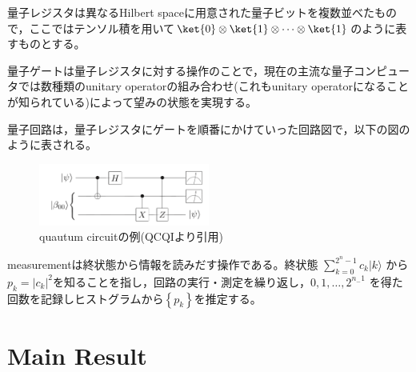 \documentclass[b5paper,papersize,dvipdfmx,fleqn]{jsarticle}
\begin{document}
量子レジスタは異なるHilbert spaceに用意された量子ビットを複数並べたもので，ここではテンソル積を用いて$\ket{0}\otimes \ket{1}\otimes \cdots \otimes \ket{1}$のように表すものとする。

量子ゲートは量子レジスタに対する操作のことで，現在の主流な量子コンピュータでは数種類のunitary operatorの組み合わせ(これもunitary operatorになることが知られている)によって望みの状態を実現する。

量子回路は，量子レジスタにゲートを順番にかけていった回路図で，以下の図のように表される。
\begin{center}
  \begin{figure}[H]
    \centering
       \includegraphics[width=0.5\textwidth]{circuit.pdf}
       \caption{quautum circuitの例(QCQIより引用)}
       \label{circuit}
  \end{figure}
\end{center}

measurementは終状態から情報を読みだす操作である。終状態 $\sum_{k=0}^{2^{n}-1} c_{k}|k\rangle$ から $p_{k}=\left|c_{k}\right|^{2}$を知ることを指し，回路の実行・測定を繰り返し，$0,1, \ldots, 2^{n_{-} 1}$ を得た回数を記録しヒストグラムから$\left\{p_{k}\right\}$を推定する。





\section{Main Result}
\end{document}
